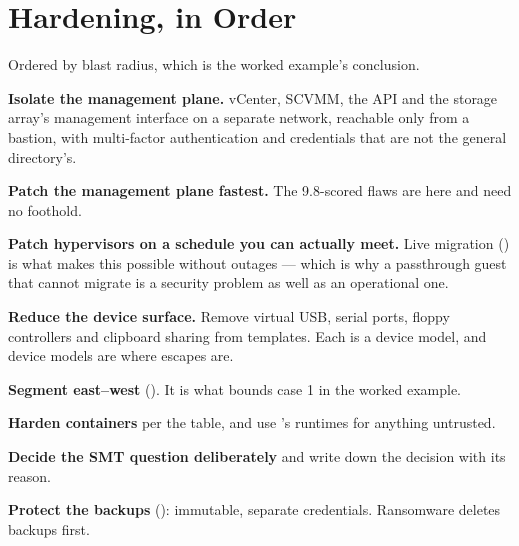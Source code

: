 \section{Hardening, in Order}

\begin{conceptbox}
Ordered by blast radius, which is the worked example's conclusion.

\begin{tight}
  \item \textbf{Isolate the management plane.} vCenter, SCVMM, the API and the
        storage array's management interface on a separate network, reachable
        only from a bastion, with multi-factor authentication and credentials
        that are not the general directory's.
  \item \textbf{Patch the management plane fastest.} The 9.8-scored flaws are
        here and need no foothold.
  \item \textbf{Patch hypervisors on a schedule you can actually meet.} Live
        migration () is what makes this possible without
        outages --- which is why a passthrough guest that cannot migrate is a
        security problem as well as an operational one.
  \item \textbf{Reduce the device surface.} Remove virtual USB, serial ports,
        floppy controllers and clipboard sharing from templates. Each is a
        device model, and device models are where escapes are.
  \item \textbf{Segment east--west} (). It is what bounds case 1
        in the worked example.
  \item \textbf{Harden containers} per the table, and use
        's runtimes for anything untrusted.
  \item \textbf{Decide the SMT question deliberately} and write down the
        decision with its reason.
  \item \textbf{Protect the backups} (): immutable, separate
        credentials. Ransomware deletes backups first.
\end{tight}
\end{conceptbox}

